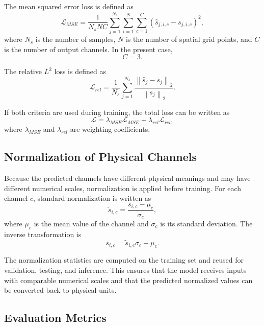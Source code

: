The mean squared error loss is defined as
\begin{equation}
\label{eq:mse}
\mathcal{L}_{MSE}
=
\frac{1}{N_sNC}
\sum_{j=1}^{N_s}
\sum_{i=1}^{N}
\sum_{c=1}^{C}
\left(
\hat{s}_{j,i,c}
-
s_{j,i,c}
\right)^2,
\end{equation}
where \(N_s\) is the number of samples, \(N\) is the number of spatial grid points, and \(C\) is the number of output channels. In the present case,
\begin{equation}
C = 3.
\end{equation}

The relative \(L^2\) loss is defined as
\begin{equation}
\mathcal{L}_{rel}
=
\frac{1}{N_s}
\sum_{j=1}^{N_s}
\frac{
\left\|
\hat{s}_j
-
s_j
\right\|_2
}{
\left\|
s_j
\right\|_2
}.
\end{equation}

If both criteria are used during training, the total loss can be written as
\begin{equation}
\mathcal{L}
=
\lambda_{MSE}\mathcal{L}_{MSE}
+
\lambda_{rel}\mathcal{L}_{rel},
\end{equation}
where \(\lambda_{MSE}\) and \(\lambda_{rel}\) are weighting coefficients.

\subsection{Normalization of Physical Channels}

Because the predicted channels have different physical meanings and may have different numerical scales, normalization is applied before training. For each channel \(c\), standard normalization is written as
\begin{equation}
\tilde{s}_{i,c}
=
\frac{
s_{i,c}
-
\mu_c
}{
\sigma_c
},
\end{equation}
where \(\mu_c\) is the mean value of the channel and \(\sigma_c\) is its standard deviation. The inverse transformation is
\begin{equation}
s_{i,c}
=
\tilde{s}_{i,c}\sigma_c
+
\mu_c.
\end{equation}

The normalization statistics are computed on the training set and reused for validation, testing, and inference. This ensures that the model receives inputs with comparable numerical scales and that the predicted normalized values can be converted back to physical units.

\subsection{Evaluation Metrics}

